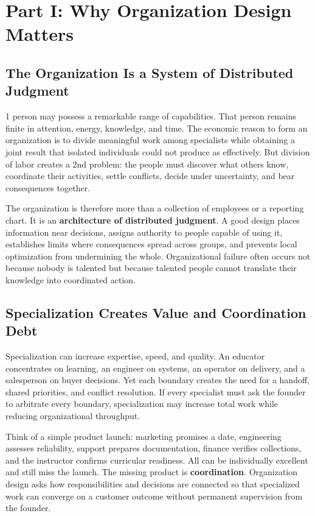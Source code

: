 \section*{Part I: Why Organization Design Matters}

\subsection{The Organization Is a System of Distributed Judgment}
\label{sec:org_distributed_judgment}

1 person may possess a remarkable range of capabilities. That person remains finite in attention, energy, knowledge, and time. The economic reason to form an organization is to divide meaningful work among specialists while obtaining a joint result that isolated individuals could not produce as effectively. But division of labor creates a 2nd problem: the people must discover what others know, coordinate their activities, settle conflicts, decide under uncertainty, and bear consequences together.

The organization is therefore more than a collection of employees or a reporting chart. It is an \textbf{architecture of distributed judgment}. A good design places information near decisions, assigns authority to people capable of using it, establishes limits where consequences spread across groups, and prevents local optimization from undermining the whole. Organizational failure often occurs not because nobody is talented but because talented people cannot translate their knowledge into coordinated action.

\subsection{Specialization Creates Value and Coordination Debt}
\label{sec:specialization_coordination_debt}

Specialization can increase expertise, speed, and quality. An educator concentrates on learning, an engineer on systems, an operator on delivery, and a salesperson on buyer decisions. Yet each boundary creates the need for a handoff, shared priorities, and conflict resolution. If every specialist must ask the founder to arbitrate every boundary, specialization may increase total work while reducing organizational throughput.

Think of a simple product launch: marketing promises a date, engineering assesses reliability, support prepares documentation, finance verifies collections, and the instructor confirms curricular readiness. All can be individually excellent and still miss the launch. The missing product is \textbf{coordination}. Organization design asks how responsibilities and decisions are connected so that specialized work can converge on a customer outcome without permanent supervision from the founder.

